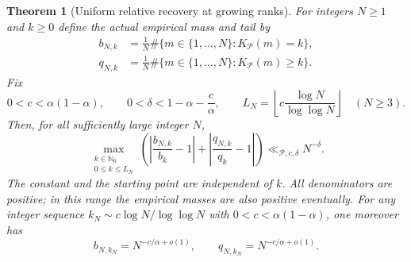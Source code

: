 \documentclass[11pt]{article}
\newtheorem{theorem}{Theorem}[section]
\theoremstyle{definition}
\begin{document}
\begin{theorem}[Uniform relative recovery at growing ranks]
\label{thm:thin-prime-growing-rank-recovery}
For integers $N\ge1$ and $k\ge0$ define the actual empirical
mass and tail by
\[
 \begin{aligned}
 b_{N,k}&=\frac1N\#\{m\in\{1,\ldots,N\}:K_{\mathcal P}(m)=k\},\\
 q_{N,k}&=\frac1N\#\{m\in\{1,\ldots,N\}:K_{\mathcal P}(m)\ge k\}.
 \end{aligned}
\]
Fix
\begin{equation}
 0<c<\alpha(1-\alpha),\qquad
 0<\delta<1-\alpha-\frac c\alpha,\qquad
 L_N=\left\lfloor c\frac{\log N}{\log\log N}\right\rfloor
 \quad(N\ge3).
 \label{eq:thin-prime-growing-rank-range}
\end{equation}
Then, for all sufficiently large integer $N$,
\begin{equation}
 \max_{\substack{k\in\mathbb N_0\\0\le k\le L_N}}
 \left(\left|\frac{b_{N,k}}{b_k}-1\right|
       +\left|\frac{q_{N,k}}{q_k}-1\right|\right)
       \ll_{\mathcal P,c,\delta}N^{-\delta}.
 \label{eq:thin-prime-growing-rank-relative}
\end{equation}
The constant and the starting point are independent of $k$.
All denominators are positive; in this range the empirical
masses are also positive eventually.
For any integer sequence
$k_N\sim c\log N/\log\log N$ with
$0<c<\alpha(1-\alpha)$, one moreover has
\begin{equation}
 b_{N,k_N}=N^{-c/\alpha+o(1)},\qquad
 q_{N,k_N}=N^{-c/\alpha+o(1)}.
 \label{eq:thin-prime-growing-rank-power}
\end{equation}
\end{theorem}
\end{document}

